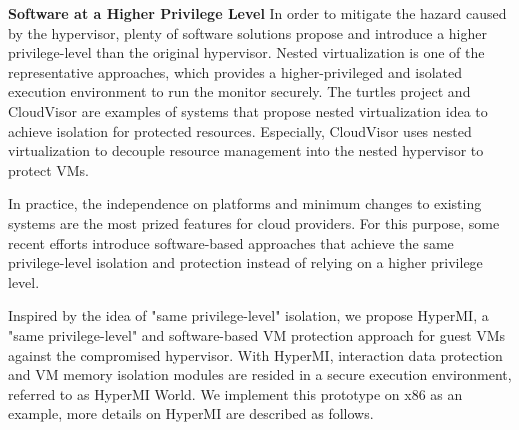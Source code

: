 \documentclass[conference]{IEEEtran}
\begin{document}
 
\textbf{Software at a Higher Privilege Level}
In order to mitigate the hazard caused by the hypervisor, plenty of software solutions propose and introduce a higher privilege-level than the original hypervisor. Nested virtualization is one of the representative approaches, which provides a higher-privileged and isolated execution environment to run the monitor securely. The turtles project \cite{Ben2007The} and CloudVisor \cite{Zhang2011CloudVisor} are examples of systems that propose nested virtualization idea to achieve isolation for protected resources. Especially, CloudVisor uses nested virtualization to decouple resource management into the nested hypervisor to protect VMs. %

In practice, the independence on platforms and minimum changes to existing systems are the most prized features for cloud providers. For this purpose,
some recent efforts introduce software-based approaches that achieve the same privilege-level isolation and protection instead of relying on a higher privilege level. 



Inspired by the idea of "same privilege-level" isolation, we propose HyperMI, a "same privilege-level" and software-based VM protection approach for guest VMs against the compromised hypervisor. 
With HyperMI, interaction data protection and VM memory isolation modules are resided in a secure execution environment, referred to as HyperMI World.
We implement this prototype on x86 as an example, more details on HyperMI are described as follows.
\end{document}
